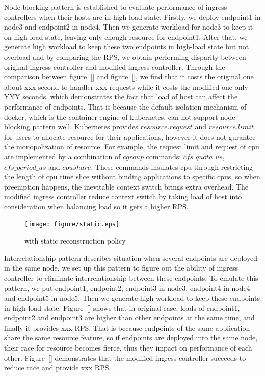 Node-blocking pattern is established to evaluate performance of ingress controllers when their hosts are in high-load state. Firstly, we deploy endpoint1 in node3 and endpoint2 in node4.
Then we generate workload for node3 to keep it on high-load state, leaving only enough resource for endpoint1. After that, we generate high workload to keep these two endpoints in
high-load state but not overload and by comparing the RPS, we obtain performing disparity between original ingress controller and modified ingress controller. Through the comparison between
figure~{\ref{}} and figure~{\ref{}}, we find that it costs the original one about xxx second to handler xxx requests while it costs the modified one only YYY seconds, which demonstrates the fact
that load of host can affect the performance of endpoints. That is because the default isolation mechanism of docker, which is the container engine of kubernetes, can not support node-blocking pattern well.
Kubernetes provides ${resource.request}$ and ${resource.limit}$ for users to allocate resource for their applications, however it does not gurantee the monopolization of resource. For example, the request
limit and request of cpu are implemented by a combination of ${cgroup}$ commands: ${cfs\_quota\_us}$,${cfs\_period\_us}$ and ${cpushare}$. These commands insulates cpu through restricting the length of cpu time slice
without binding applications to specific cpus, so when preemption happens, the inevitable context switch brings extra overhead. The modified ingress controller reduce context switch by taking load of host into consideration
when balancing load so it gets a higher RPS.


\begin{figure}[!htb]
 \centering
 \texttt{[image: figure/static.eps]}\\
 \caption{\name{} with static reconstruction policy}
 \label{fig:static}
\end{figure}

Interrelationship pattern describes situation when several endpoints are deployed in the same node, we set up this pattern to figure out the ability of ingress controller to eliminate interrelationship
between these endpoints. To emulate this pattern, we put endpoint1, endpoint2, endpoint3 in node3, endpoint4  in node4 and endpoint5 in node5. Then we generate high workload to keep these endpoints in high-load
state. Figure~{\ref{}} shows that in original case, loads of endpoint1, endpoint2 and endpoint3 are higher than other endpoints at the same time, and finally it provides xxx RPS. That is because endpoints of the same
application share the same resource feature, so if endpoints are deployed into the same node, their race for resource becomes fierce, thus they impact on performance of each other. Figure~{\ref{}} demonstrates that
the modified ingress controller succeeds to reduce race and provide xxx RPS.

